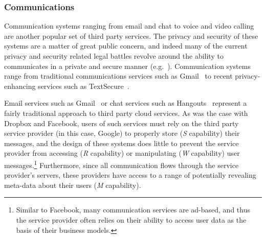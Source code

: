 \subsubsection{Communications}

Communication systems ranging from email and chat to voice and video
calling are another popular set of third party services. The privacy
and security of these systems are a matter of great public concern,
and indeed many of the current privacy and security related legal
battles revolve around the ability to communicates in a private and
secure manner (e.g.~\cite{apple-fbiletter, greenwald-prism,
  levsion-lavabit}). Communication systems range from traditional
communications services such as Gmail~\cite{google-gmail} to recent
privacy-enhancing services such as
TextSecure~\cite{otr-advanced-ratchet}.

Email services such as Gmail~\cite{google-gmail} or chat services such
as Hangouts~\cite{google-hangouts} represent a fairly traditional
approach to third party cloud services. As was the case with Dropbox
and Facebook, users of such services must rely on the third party
service provider (in this case, Google) to properly store (\emph{S}
capability) their messages, and the design of these systems does
little to prevent the service provider from accessing (\emph{R}
capability) or manipulating (\emph{W} capability) user
messages.\footnote{Similar to Facebook, many communication services
  are ad-based, and thus the service provider often relies on their
  ability to access user data as the basis of their business models.}
Furthermore, since all communication flows through the service
provider's servers, these providers have access to a range of
potentially revealing meta-data about their users (\emph{M}
capability).

